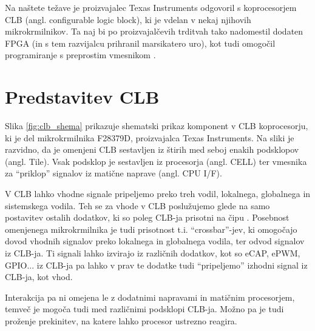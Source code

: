 \documentclass[a4paper]{article}
\begin{document}
\begin{sloppypar}
Na naštete težave je proizvajalec Texas Instruments odgovoril s koprocesorjem
CLB (angl. configurable logic block), ki je vdelan v nekaj njihovih
mikrokrmilnikov. Ta naj bi po proizvajalčevih trditvah tako nadomestil dodaten
FPGA (in s tem razvijalcu prihranil marsikatero uro), kot tudi omogočil
programiranje s preprostim vmesnikom \cite{clb-intro}.



\section{Predstavitev CLB}\label{sec:predstavitev}
Slika \ref{fig:clb_shema} prikazuje shematski prikaz komponent v CLB
koprocesorju, ki je del mikrokrmilnika F28379D, proizvajalca Texas Instruments.
Na sliki je razvidno, da je omenjeni CLB sestavljen iz štirih med seboj enakih
podsklopov (angl. Tile). Vsak podsklop je sestavljen iz procesorja (angl. CELL)
ter vmesnika za ``priklop'' signalov iz matične naprave (angl. CPU I/F).

V CLB lahko vhodne signale pripeljemo preko treh vodil, lokalnega, globalnega
in sistemskega vodila. Teh se za vhode v CLB poslužujemo glede na samo
postavitev ostalih dodatkov, ki so poleg CLB-ja prisotni na čipu
\cite[Pogl.~26.3]{mcu-ref-manual}. Posebnost omenjenega mikrokrmilnika je tudi
prisotnost t.i. ``crossbar''-jev, ki omogočajo dovod vhodnih signalov preko
lokalnega in globalnega vodila, ter odvod signalov iz CLB-ja. Ti signali lahko
izvirajo iz različnih dodatkov, kot so eCAP, ePWM, GPIO... iz CLB-ja pa lahko v
prav te dodatke tudi ``pripeljemo'' izhodni signal iz CLB-ja, kot vhod.

Interakcija pa ni omejena le z dodatnimi napravami in matičnim procesorjem,
temveč je mogoča tudi med različnimi podsklopi CLB-ja. Možno pa je tudi
proženje prekinitev, na katere lahko procesor ustrezno reagira.


\end{sloppypar}
\end{document}
